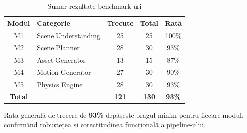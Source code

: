 \begin{table}[h]
\centering
\begin{tabular}{c l c c c}
\hline
\textbf{Modul} & \textbf{Categorie} & \textbf{Trecute} & \textbf{Total} & \textbf{Rată} \\
\hline
M1 & Scene Understanding & 25 & 25 & 100\% \\
M2 & Scene Planner & 28 & 30 & 93\% \\
M3 & Asset Generator & 13 & 15 & 87\% \\
M4 & Motion Generator & 27 & 30 & 90\% \\
M5 & Physics Engine & 28 & 30 & 93\% \\
\hline
\textbf{Total} & & \textbf{121} & \textbf{130} & \textbf{93\%} \\
\hline
\end{tabular}
\caption{Sumar rezultate benchmark-uri}
\label{tab:results_summary}
\end{table}

Rata generală de trecere de \textbf{93\%} depășește pragul minim pentru fiecare modul, confirmând robustețea și corectitudinea funcțională a pipeline-ului.
